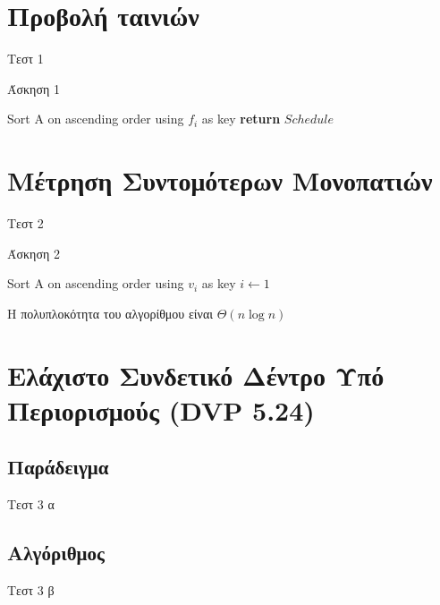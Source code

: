 \documentclass[a4paper,11pt]{article}
\begin{document}
\renewcommand{\labelenumi}{\roman{enumi})}
\renewcommand{\labelenumii}{ (\arabic{enumii}) }



\section{Προβολή ταινιών} \setcounter{section}{1}
Τεστ 1

\begin{algorithm}[H]
\caption{Άσκηση 1}
\begin{algorithmic}[1]
    \State Sort A on ascending order using $f_i$ as key
    \State \textbf{return} $Schedule$
    \EndIf
\EndProcedure
\end{algorithmic}
\end{algorithm}


\section{Μέτρηση Συντομότερων Μονοπατιών}
Τεστ 2

\begin{algorithm}[H]
\caption{Άσκηση 2}
\begin{algorithmic}[1]
    \State Sort A on ascending order using $v_i$ as key
    \State $i \gets 1$
\EndProcedure
\end{algorithmic}
\end{algorithm}

Η πολυπλοκότητα του αλγορίθμου είναι $\Theta(n\log{n})$


\section{Ελάχιστο Συνδετικό Δέντρο Υπό Περιορισμούς (DVP 5.24)}
\subsection{Παράδειγμα}
Τεστ 3 α

\subsection{Αλγόριθμος}
Τεστ 3 β
\end{document}
